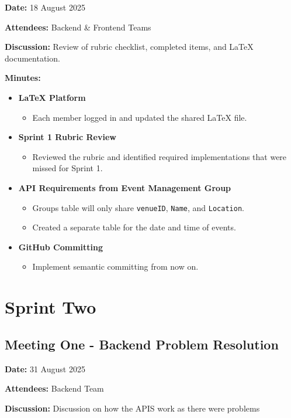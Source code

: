 \textbf{Date:} 18 August 2025 \par
\textbf{Attendees:} Backend \& Frontend Teams \par
\textbf{Discussion:} Review of rubric checklist, completed items, and LaTeX documentation. \par

\textbf{Minutes:}
\begin{itemize}
    \item \textbf{LaTeX Platform}
    \begin{itemize}
        \item Each member logged in and updated the shared LaTeX file.
    \end{itemize}

    \item \textbf{Sprint 1 Rubric Review}
    \begin{itemize}
        \item Reviewed the rubric and identified required implementations that were missed for Sprint 1.
    \end{itemize}

    \item \textbf{API Requirements from Event Management Group}
    \begin{itemize}
        \item Groups table will only share \texttt{venueID}, \texttt{Name}, and \texttt{Location}.
        \item Created a separate table for the date and time of events.
    \end{itemize}

    \item \textbf{GitHub Committing}
    \begin{itemize}
        \item Implement semantic committing from now on.
    \end{itemize}
\end{itemize}


\section{Sprint Two}

\subsection{Meeting One - Backend Problem Resolution} 
\textbf{Date:} 31 August 2025 \par
\textbf{Attendees:} Backend Team \par
\textbf{Discussion:} Discussion on how the APIS work as there were problems \par

